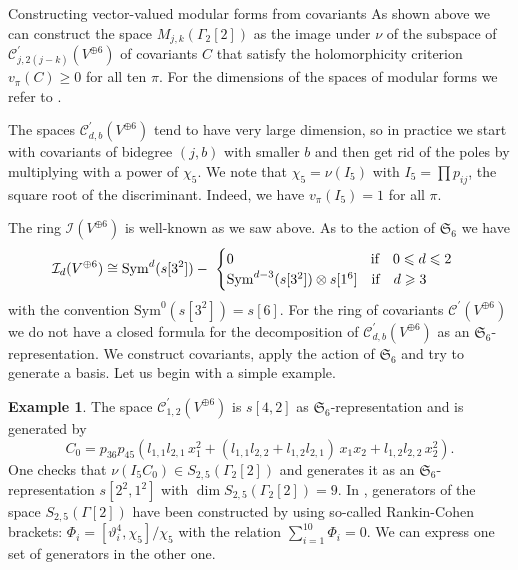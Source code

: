 \documentclass[12pt]{amsart}
\numberwithin{equation}{section}
\newcommand{\Sym}{{\mathrm{Sym}}}
\def\geq{\geqslant}
\numberwithin{equation}{section}
\theoremstyle{definition}
\newtheorem{example}[theorem]{Example}
\theoremstyle{remark}
\begin{document}
\begin{section}{Constructing vector-valued modular forms from covariants}
As shown above we can construct the space $M_{j,k}(\Gamma_2[2])$ as the
image under $\nu$ of the subspace of $\mathcal{C}_{j,2(j-k)}^{\prime}(V^{\oplus 6})$
of covariants $C$ that satisfy the holomorphicity criterion $v_{\pi}(C)\geq 0$
for all ten $\pi$. For the dimensions of the spaces of modular forms we refer to \cite{BC}.

The spaces $\mathcal{C}_{d,b}^{\prime}(V^{\oplus 6})$ tend to have very large
dimension, so in practice we start with covariants of bidegree $(j,b)$ with smaller
$b$ and then get rid of the poles by multiplying with a power of $\chi_5$.
We note that $\chi_5= \nu(I_5)$ with $I_5=\prod p_{ij}$, the square root of the
discriminant. Indeed, we have $v_{\pi}(I_5)=1$ for all $\pi$.

The ring $\mathcal{I}(V^{\oplus 6})$ is well-known as we saw above. As to
the action of $\mathfrak{S}_6$ we have
\[
\mathcal{I}_d(V^{\oplus 6})\cong \Sym^d(s[3^2])-\
\begin{cases}
0 \quad \hspace{3.1cm}\text{if} \quad 0\leqslant d\leqslant 2\\
\Sym^{d-3}(s[3^2])\otimes s[1^6] \quad \text{if} \quad d\geqslant 3\\
\end{cases}
\]
with the convention $\Sym^0(s[3^2])=s[6]$.
For the ring of covariants $\mathcal{C}^{\prime}(V^{\oplus 6})$ we do not
have a closed formula for the decomposition of $\mathcal{C}_{d,b}^{\prime}(V^{\oplus 6})$
as an $\mathfrak{S}_6$-representation. We construct covariants, apply the action of
$\mathfrak{S}_6$ and try to generate a basis.
Let us begin with a simple example. 
\begin{example}
The space $\mathcal{C}^{\prime}_{1,2}(V^{\oplus 6})$
is $s[4,2]$ as $\mathfrak{S}_6$-representation and is generated by 
\[
C_0= p_{36}p_{45}\left(l_{1,1} l_{2,1}\,x_1^2+ \left(l_{1,1} l_{2,2}+l_{1,2} l_{2,1}\right)\,x_1x_2+l_{1,2} l_{2,2} \,x_2^2\right).
\]
One checks that $\nu(I_5C_0)\in S_{2,5}(\Gamma_2[2])$ and generates it as an 
$\mathfrak{S}_6$-representation $s[2^2,1^2]$
with $\dim S_{2,5}(\Gamma_2[2])=9$. In \cite[Section 15 and 20]{CvdGG}, generators of the 
space $S_{2,5}(\Gamma[2])$ have been constructed by using so-called Rankin-Cohen brackets:
$\Phi_i=[\vartheta_i^4,\chi_5]/\chi_5$ with the relation $\sum_{i=1}^{10}\Phi_i=0$.
We  can express one set of generators in the other one.
\end{example}


\end{section}
\end{document}
